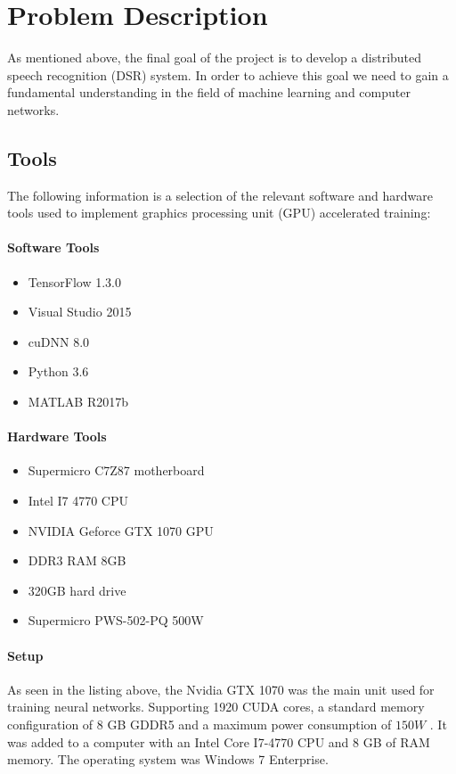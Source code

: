 \chapter{Problem Description}\label{ch:problem_description}

As mentioned above, the final goal of the project is to develop a distributed speech recognition (DSR) system.
In order to achieve this goal we need to gain a fundamental understanding in the field of machine learning and computer networks.\\

\section{Tools}
The following information is a selection of the relevant software and hardware tools used to implement graphics processing unit (GPU) accelerated training:

\subsubsection{Software Tools}
\begin{itemize}
    \item TensorFlow 1.3.0
    \item Visual Studio 2015
    \item cuDNN 8.0
    \item Python 3.6
    \item MATLAB  R2017b
\end{itemize}

\subsubsection{Hardware Tools}
\begin{itemize}
    \item Supermicro C7Z87 motherboard
    \item Intel I7 4770 CPU
    \item NVIDIA Geforce GTX 1070 GPU
    \item DDR3 RAM 8GB
    \item 320GB hard drive
    \item Supermicro PWS-502-PQ 500W
\end{itemize}

\subsubsection{Setup}
As seen in the listing above, the Nvidia GTX 1070 was the main unit used for training neural networks.
Supporting 1920 CUDA cores, a standard memory configuration of 8 GB GDDR5 and a maximum power consumption of  $150W$ \cite{GPU}. It was added to a computer with an Intel Core I7-4770 CPU and 8 GB of RAM memory. The operating system was Windows 7 Enterprise.

